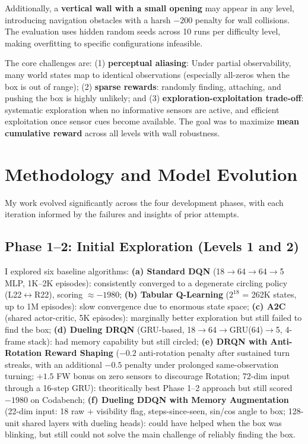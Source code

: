 \documentclass[10.5pt, oneside]{article}
\begin{document}
Additionally, a \textbf{vertical wall with a small opening} may appear in any level, introducing navigation obstacles with a harsh $-200$ penalty for wall collisions. The evaluation uses hidden random seeds across 10 runs per difficulty level, making overfitting to specific configurations infeasible.

The core challenges are: (1) \textbf{perceptual aliasing}: Under partial observability, many world states map to identical observations (especially all-zeros when the box is out of range); (2) \textbf{sparse rewards}: randomly finding, attaching, and pushing the box is highly unlikely; and (3) \textbf{exploration-exploitation trade-off}: systematic exploration when no informative sensors are active, and efficient exploitation once sensor cues become available. The goal was to maximize \textbf{mean cumulative reward} across all levels with wall robustness.

\section{Methodology and Model Evolution}

My work evolved significantly across the four development phases, with each iteration informed by the failures and insights of prior attempts.

\subsection{Phase 1--2: Initial Exploration (Levels 1 and 2)}

I explored six baseline algorithms: \textbf{(a) Standard DQN} (18$\to$64$\to$64$\to$5 MLP, 1K--2K episodes): consistently converged to a degenerate circling policy (L22$\leftrightarrow$R22), scoring $\approx$$-1980$; \textbf{(b) Tabular Q-Learning} ($2^{18}$ = 262K states, up to 1M episodes): slow convergence due to enormous state space; \textbf{(c) A2C} (shared actor-critic, 5K episodes): marginally better exploration but still failed to find the box; \textbf{(d) Dueling DRQN} (GRU-based, 18$\to$64$\to$GRU(64)$\to$5, 4-frame stack): had memory capability but still circled; \textbf{(e) DRQN with Anti-Rotation Reward Shaping} ($-0.2$ anti-rotation penalty after sustained turn streaks, with an additional $-0.5$ penalty under prolonged same-observation turning; $+1.5$ FW bonus on zero sensors to discourage Rotation; 72-dim input through a 16-step GRU): theoritically best Phase 1--2 approach but still scored $-1980$ on Codabench; \textbf{(f) Dueling DDQN with Memory Augmentation} (22-dim input: 18 raw + visibility flag, steps-since-seen, sin/cos angle to box; 128-unit shared layers with dueling heads): could have helped when the box was blinking, but still could not solve the main challenge of reliably finding the box.
\end{document}
